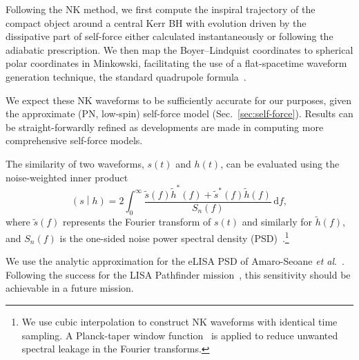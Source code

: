 \documentclass[aps,prd,amsfonts,amssymb,amsmath,nofootinbib,showpacs,superscriptaddress,twocolumn,floatfix]{revtex4-1}
\newcommand{\eqnref}[1]{Eq.~(\ref{eq:#1})}
\newcommand{\secref}[1]{Sec.~\ref{sec:#1}}
\newcommand{\dd}{\ensuremath{\mathrm{d}}}
\newcommand{\intd}[4]{\ensuremath{\int_{#1}^{#2}{#3}\,\dd{#4}}}
\newcommand{\overlap}[2]{\ensuremath{\left(#1\middle|#2\right)}}
\begin{document}
Following the NK method, we first compute the inspiral trajectory of the compact object around a central Kerr BH with evolution driven by the dissipative part of self-force either calculated instantaneously or following the adiabatic prescription. We then map the Boyer--Lindquist coordinates to spherical polar coordinates in Minkowski, facilitating the use of a flat-spacetime waveform generation technique, the standard quadrupole formula~\cite{Misner1973}.

We expect these NK waveforms to be sufficiently accurate for our purposes, given the approximate (PN, low-spin) self-force model (\secref{self-force}). Results can be straight-forwardly refined as developments are made in computing more comprehensive self-force models.

The similarity of two waveforms, $s(t)$ and $h(t)$, can be evaluated using the noise-weighted inner product~\cite{Finn1992}
\begin{equation}
\label{eq:innerprod}
\overlap{s}{h} = 2 \intd{0}{\infty}{\frac{\tilde{s}(f)\tilde{h}^*(f)+\tilde{s}^*(f)\tilde{h}(f)}{S_n(f)}}{f},
\end{equation}
where $\tilde{s}(f)$ represents the Fourier transform of $s(t)$ and similarly for $\tilde{h}(f)$, and $S_n(f)$ is the one-sided noise power spectral density (PSD)~\cite{Moore2014a}.\footnote{We use cubic interpolation to construct NK waveforms with identical time sampling. 
A Planck-taper window function~\cite{McKechan2010} is applied to reduce unwanted spectral leakage in the Fourier transforms. 
}

We use the analytic approximation for the eLISA PSD of Amaro-Seoane {\it{et al}}.~\cite{Amaro-Seoane2012a}. Following the success for the LISA Pathfinder mission~\cite{Armano2016}, this sensitivity should be achievable in a future mission.
\end{document}
